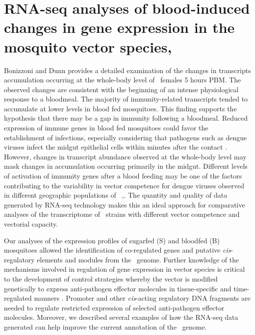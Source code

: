 \pagebreak

\section{RNA-seq analyses of blood-induced changes in gene expression in the mosquito vector species, \Aea\ \cite{Bonizzoni2011}}



Bonizzoni and Dunn \cite{Bonizzoni2011} provides a detailed examination of the changes in transcripts accumulation occurring at the whole-body level of \Aa\  females 5 hours \gls{PBM}. The observed changes are consistent with the beginning of an intense physiological response to a bloodmeal. The majority of immunity-related transcripts tended to accumulate at lower levels in blood fed mosquitoes. This finding supports the hypothesis that there may be a gap in immunity following a bloodmeal. Reduced expression of immune genes in blood fed mosquitoes could favor the establishment of infections, especially considering that pathogens such as dengue viruses infect the midgut epithelial cells within minutes after the contact \cite{Salazar2007}. However, changes in transcript abundance observed at the whole-body level may mask changes in accumulation occurring primarily in the midgut. Different levels of activation of immunity genes after a blood feeding may be one of the factors contributing to the variability in vector competence for dengue viruses observed in different geographic populations of \Aa\  \cite{Bennett2002},\cite{Black2002}. The quantity and quality of data generated by RNA-seq technology makes this an ideal approach for comparative analyses of the transcriptome of \Aa\ strains with different vector competence and vectorial capacity.

Our analyses of the expression profiles of sugarfed (S) and bloodfed (B) mosquitoes allowed the identification of co-regulated genes and putative \textit{cis}-regulatory elements and modules from the \Aa\  genome. Further knowledge of the mechanisms involved in regulation of gene expression in vector species is critical to the development of control strategies whereby the vector is modified genetically to express anti-pathogen effector molecules in tissue-specific and time-regulated manners \cite{Terenius2008}. Promoter and other \textit{cis}-acting regulatory DNA fragments are needed to regulate restricted expression of selected anti-pathogen effector molecules. Moreover, we described several examples of how the RNA-seq data generated can help improve the current annotation of the \Aa\  genome.

